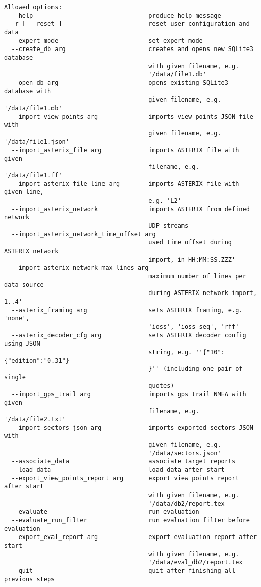 \begin{lstlisting}
Allowed options:
  --help                                produce help message
  -r [ --reset ]                        reset user configuration and data
  --expert_mode                         set expert mode
  --create_db arg                       creates and opens new SQLite3 database 
                                        with given filename, e.g. 
                                        '/data/file1.db'
  --open_db arg                         opens existing SQLite3 database with 
                                        given filename, e.g. '/data/file1.db'
  --import_view_points arg              imports view points JSON file with 
                                        given filename, e.g. '/data/file1.json'
  --import_asterix_file arg             imports ASTERIX file with given 
                                        filename, e.g. '/data/file1.ff'
  --import_asterix_file_line arg        imports ASTERIX file with given line, 
                                        e.g. 'L2'
  --import_asterix_network              imports ASTERIX from defined network 
                                        UDP streams
  --import_asterix_network_time_offset arg
                                        used time offset during ASTERIX network
                                        import, in HH:MM:SS.ZZZ'
  --import_asterix_network_max_lines arg
                                        maximum number of lines per data source
                                        during ASTERIX network import, 1..4'
  --asterix_framing arg                 sets ASTERIX framing, e.g. 'none', 
                                        'ioss', 'ioss_seq', 'rff'
  --asterix_decoder_cfg arg             sets ASTERIX decoder config using JSON 
                                        string, e.g. ''{"10":{"edition":"0.31"}
                                        }'' (including one pair of single 
                                        quotes)
  --import_gps_trail arg                imports gps trail NMEA with given 
                                        filename, e.g. '/data/file2.txt'
  --import_sectors_json arg             imports exported sectors JSON with 
                                        given filename, e.g. 
                                        '/data/sectors.json'
  --associate_data                      associate target reports
  --load_data                           load data after start
  --export_view_points_report arg       export view points report after start 
                                        with given filename, e.g. 
                                        '/data/db2/report.tex
  --evaluate                            run evaluation
  --evaluate_run_filter                 run evaluation filter before evaluation
  --export_eval_report arg              export evaluation report after start 
                                        with given filename, e.g. 
                                        '/data/eval_db2/report.tex
  --quit                                quit after finishing all previous steps
\end{lstlisting}
\ \\

